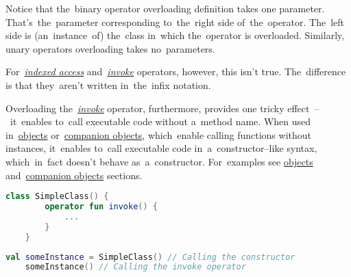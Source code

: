 \noindent Notice that the~binary operator overloading definition takes one parameter.
That's~the~parameter corresponding to~the~right side of~the~operator.
The~left side is (an~instance~of) the~class in~which the~operator is overloaded.
Similarly, unary operators overloading takes no~parameters.

For~\hyperref[kotlinindexedaccess]{\textit{indexed access}} \mbox{and \hyperref[kotlininvoke]{\textit{invoke}}} operators, however, this isn't true.
The~difference is that they~aren't written in~the~infix notation.

\label{kotlininvokeoverload}
Overloading the~\hyperref[kotlininvoke]{\textit{invoke}} operator, furthermore, provides one tricky effect~--~it~enables to~call executable code without a~method name.
When used in~\hyperref[kotlinobject]{objects} or~\hyperref[kotlincompanionobject]{companion objects}, which~enable calling functions without instances, it~enables to~call executable code in~a~constructor--like syntax, which~in~fact doesn't behave as~a~constructor.
For~examples see \hyperref[kotlinobject]{objects} and~\hyperref[kotlincompanionobject]{companion objects} sections.
\newpage

\begin{lstlisting}[language=Kotlin, title={Custom class with \textit{invoke} operator overloading}]
    class SimpleClass() {
        operator fun invoke() {
            ...
        }
    }
\end{lstlisting}
\begin{lstlisting}[language=Kotlin, title={Usage -- no conflict with constructor}]
    val someInstance = SimpleClass() // Calling the constructor
    someInstance() // Calling the invoke operator
\end{lstlisting}
